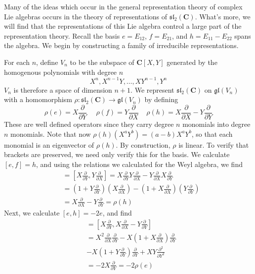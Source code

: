 Many of the ideas which occur in the general representation theory of complex Lie algebras occurs in the theory of representations of $\mathfrak{sl}_2(\mathbf{C})$. What's more, we will find that the representations of this Lie algebra control a large part of the representation theory. Recall the basis $e = E_{12}$, $f = E_{21}$, and $h = E_{11} - E_{22}$ spans the algebra. We begin by constructing a family of irreducible representations.

For each $n$, define $V_n$ to be the subspace of $\mathbf{C}[X,Y]$ generated by the homogenous polynomials with degree $n$
%
\[ X^n, X^{n-1}Y, \dots, XY^{n-1}, Y^n \]
%
$V_n$ is therefore a space of dimension $n+1$. We represent $\mathfrak{sl}_2(\mathbf{C})$ on $\mathfrak{gl}(V_n)$ with a homomorphism $\rho: \mathfrak{sl}_2(\mathbf{C}) \to \mathfrak{gl}(V_n)$ by defining
%
\[ \rho(e) = X \frac{\partial}{\partial Y} \ \ \ \ \ \ \rho(f) = Y \frac{\partial}{\partial X}\ \ \ \ \ \rho(h) = X \frac{\partial}{\partial X} - Y \frac{\partial}{\partial Y} \]
%
These are well defined operators since they carry degree $n$ monomials into degree $n$ monomials. Note that now $\rho(h)(X^aY^b) = (a - b) X^aY^b$, so that each monomial is an eigenvector of $\rho(h)$. By construction, $\rho$ is linear. To verify that brackets are preserved, we need only verify this for the basis. We calculate $[e, f] = h$, and using the relations we calculated for the Weyl algebra, we find
%
\begin{align*}
    [\rho(e),\rho(f)] &= \left[ X \frac{\partial}{\partial Y}, Y \frac{\partial}{\partial X} \right] = X \frac{\partial}{\partial Y} Y \frac{\partial}{\partial X} - Y \frac{\partial}{\partial X} X \frac{\partial}{\partial Y}\\
    &= \left(1 + Y \frac{\partial}{\partial Y} \right) \left( X \frac{\partial}{\partial X} \right) - \left( 1 + X \frac{\partial}{\partial X} \right) \left( Y \frac{\partial}{\partial Y} \right)\\
    &= X \frac{\partial}{\partial X} - Y \frac{\partial}{\partial Y} = \rho(h)
\end{align*}
%
Next, we calculate $[e, h] = -2 e$, and find
%
\begin{align*}
    [\rho(e), \rho(h)] &= \left[ X \frac{\partial}{\partial Y}, X \frac{\partial}{\partial X} - Y \frac{\partial}{\partial Y} \right]\\
    &= X^2 \frac{\partial}{\partial X} \frac{\partial}{\partial Y} - X \left(1 + X \frac{\partial}{\partial X} \right) \frac{\partial}{\partial Y}\\
    &- X \left( 1 + Y \frac{\partial}{\partial Y} \right) \frac{\partial}{\partial Y} + X Y \frac{\partial^2}{\partial Y^2}\\
    &= -2 X \frac{\partial}{\partial Y} = -2 \rho(e)
\end{align*}

